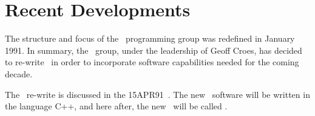 

\newcommand{\AIPRELEASE}{January 15, 1991}
\newcommand{\AIPVOLUME}{Volume XI}
\newcommand{\AIPNUMBER}{Number 1}
\newcommand{\JANNO}{15JAN91}
\newcommand{\APRNO}{15APR91}
\newcommand{\JULNO}{15JUL91}
\newcommand{\OCTNO}{15OCT91}
\newcommand{\RELEASENAME}{\JANNO}



\normalstyle
\section{Recent Developments}
The structure and focus of the \AIPS\  programming group was redefined in
January 1991.  In summary, the \AIPS\  group, under the leadership of Geoff
Croes, has decided to re-write \AIPS\  in order to incorporate software
capabilities needed for the coming decade.

The \AIPS\ re-write is discussed in the \APRNO\ {\tt \AIPSLETTER}.
The new \AIPS\  software will be written in the language C++, and here after,
the new \AIPS\  will be called \AIPTOO.

